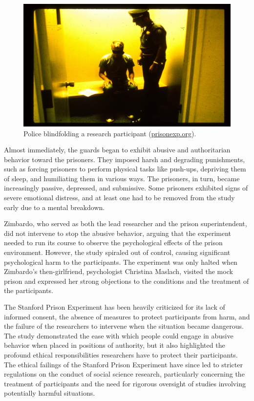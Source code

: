 \documentclass[
]{book}
\begin{document}
\begin{figure}
\centering
\includegraphics[width=1\linewidth,height=\textheight,keepaspectratio]{images/police-blindfolding.jpg}
\caption{Police blindfolding a research participant (\href{https://www.prisonexp.org/gallery}{prisonexp.org}).}
\end{figure}

Almost immediately, the guards began to exhibit abusive and authoritarian behavior toward the prisoners. They imposed harsh and degrading punishments, such as forcing prisoners to perform physical tasks like push-ups, depriving them of sleep, and humiliating them in various ways. The prisoners, in turn, became increasingly passive, depressed, and submissive. Some prisoners exhibited signs of severe emotional distress, and at least one had to be removed from the study early due to a mental breakdown.

Zimbardo, who served as both the lead researcher and the prison superintendent, did not intervene to stop the abusive behavior, arguing that the experiment needed to run its course to observe the psychological effects of the prison environment. However, the study spiraled out of control, causing significant psychological harm to the participants. The experiment was only halted when Zimbardo's then-girlfriend, psychologist Christina Maslach, visited the mock prison and expressed her strong objections to the conditions and the treatment of the participants.

The Stanford Prison Experiment has been heavily criticized for its lack of informed consent, the absence of measures to protect participants from harm, and the failure of the researchers to intervene when the situation became dangerous. The study demonstrated the ease with which people could engage in abusive behavior when placed in positions of authority, but it also highlighted the profound ethical responsibilities researchers have to protect their participants. The ethical failings of the Stanford Prison Experiment have since led to stricter regulations on the conduct of social science research, particularly concerning the treatment of participants and the need for rigorous oversight of studies involving potentially harmful situations.
\end{document}
